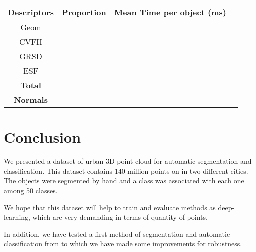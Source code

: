 \documentclass[a4paper, 10pt, journal]{article}
\begin{document}
\begin{center}
  \centering
  \begin{tabular}{cccc}
  \toprule
     \textbf{Descriptors} & \textbf{Proportion} & \textbf{Mean Time per object (ms)} \\
  \midrule  
   Geom		    	& 	&   \\
  \midrule  
   CVFH				& 	&  \\
  \midrule  
   GRSD				& 	&   \\
  \midrule  
   ESF				& 	&  \\
  \midrule  
   \textbf{Total}	& 	&  \\
  \midrule \midrule
   \textbf{Normals}  & & \\
  \bottomrule 
 \end{tabular}
\end{center}





\section{Conclusion}


We presented a dataset of urban 3D point cloud for automatic segmentation and classification. This dataset contains 140 million points on  in two different cities. The objects were segmented by hand and a class was associated with each one among 50 classes.

We hope that this dataset will help to train and evaluate methods as deep-learning, which are very demanding in terms of quantity of points.

In addition, we have tested a first method of segmentation and automatic classification from \cite{roynard2016fast} to which we have made some improvements for robustness.



\end{document}
